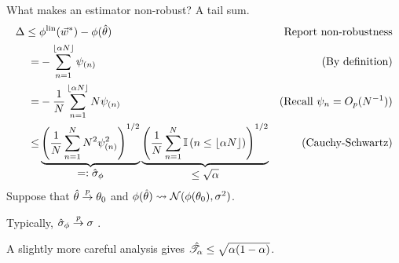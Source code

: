 

\begin{frame}{What makes an estimator non-robust?  A tail sum.}
%
\begin{align*}
%
\Delta \le{}& \thetafunlin(\w^*) - \thetafun(\thetahat)
        & \textrm{Report non-robustness}
    \\=&{} -\sum_{n=1}^{\lfloor \alpha N \rfloor} \infl_{(n)}
        & \textrm{(By definition)}
    \\=&{} -\frac{1}{N} \sum_{n=1}^{\lfloor \alpha N \rfloor} N \infl_{(n)}
        & \textrm{(Recall }\infl_n = O_p(N^{-1})\textrm{)}
    \\\le&{}
        \underbrace{
            \left( \meann N^2 \infl_{(n)}^2 \right)^{1/2}
        }_{\displaystyle =: \noise}
        \underbrace{
            \left( \meann \ind{n \le \lfloor \alpha N \rfloor} \right)^{1/2}
        }_{\displaystyle \le \sqrt{\alpha}}
        & \textrm{(Cauchy-Schwartz)}
%
\end{align*}
%
Suppose that $\hat{\theta} \overset{p}{\rightarrow} \theta_0$ and $\phi(\hat{\theta})
\rightsquigarrow \mathcal{N}(\phi(\theta_0), \sigma^2)$.

Typically, $\hat\sigma_{\phi} \overset{p}{\rightarrow} \sigma$ \citep{hampel1986robustbook}.

A slightly more careful analysis gives $\hat{\mathscr{T}}_\alpha \le \sqrt{\alpha(1-\alpha)}$.


\end{frame}




